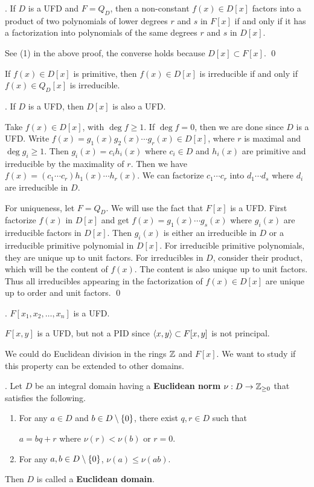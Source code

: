 \cor. If \(D\) is a UFD and \(F = Q_D\), then a non-constant \(f(x) \in D[x]\) factors into a product of two polynomials of lower degrees \(r\) and \(s\) in \(F[x]\) if and only if it has a factorization into polynomials of the same degrees \(r\) and \(s\) in \(D[x]\).

\pf See (1) in the above proof, the converse holds because \(D[x] \subset F[x]\). \qed

\rmk If \(f(x) \in D[x]\) is primitive, then \(f(x) \in D[x]\) is irreducible if and only if \(f(x) \in Q_D[x]\) is irreducible.

\thm. If \(D\) is a UFD, then \(D[x]\) is also a UFD.

\pf Take \(f(x) \in D[x]\), with \(\deg f \geq 1\). If \(\deg f = 0\), then we are done since \(D\) is a UFD. Write \(f(x) = g_1(x) g_2(x) \cdots g_r(x) \in D[x]\), where \(r\) is maximal and \(\deg g_i \geq 1\). Then \(g_i(x) = c_ih_i(x)\) where \(c_i \in D\) and \(h_i(x)\) are primitive and irreducible by the maximality of \(r\). Then we have \(f(x) = (c_1 \cdots c_r)h_1(x) \cdots h_r(x)\). We can factorize \(c_1 \cdots c_r\) into \(d_1 \cdots d_s\) where \(d_i\) are irreducible in \(D\).

For uniqueness, let \(F = Q_D\). We will use the fact that \(F[x]\) is a UFD. First factorize \(f(x)\) in \(D[x]\) and get \(f(x) = g_1(x) \cdots g_s(x)\) where \(g_i(x)\) are irreducible factors in \(D[x]\). Then \(g_i(x)\) is either an irreducible in \(D\) or a irreducible primitive polynomial in \(D[x]\). For irreducible primitive polynomials, they are unique up to unit factors. For irreducibles in \(D\), consider their product, which will be the content of \(f(x)\). The content is also unique up to unit factors. Thus all irreducibles appearing in the factorization of \(f(x) \in D[x]\) are unique up to order and unit factors. \qed

\cor. \(F[x_1, x_2, \dots, x_n]\) is a UFD.

\rmk \(F[x, y]\) is a UFD, but not a PID since \(\left\langle x, y \right\rangle \subset F[x, y]\) is not principal.

\pagebreak


We could do Euclidean division in the rings \(\mathbb{Z}\) and \(F[x]\). We want to study if this property can be extended to other domains.

.  Let \(D\) be an integral domain having a \textbf{Euclidean norm} \(\nu : D \rightarrow \mathbb{Z}_{\geq 0}\) that satisfies the following.
\begin{enumerate}
    \item For any \(a \in D\) and \(b \in D \setminus \{0\}\), there exist \(q, r \in D\) such that
    \begin{center}
        \(a = bq + r\) \quad where \quad \(\nu(r) < \nu(b)\) or \(r = 0\).
    \end{center}
    \item For any \(a, b \in D \setminus \{0\}\), \(\nu(a) \leq \nu(ab)\).
\end{enumerate}
Then \(D\) is called a \textbf{Euclidean domain}.

